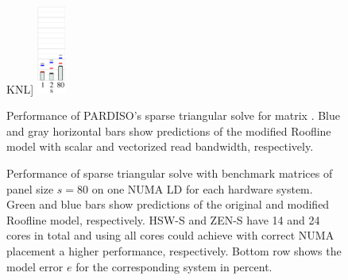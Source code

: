 \begin{figure}[t]
KNL]{%
\includegraphics[height=2.9cm,clip=true]{images/perf/ps-n-20000/p-single-core-knightmare1-n-20000}
\label{fig:p:single-core:knl}
} %
  \caption{Performance of PARDISO's sparse triangular solve
    for matrix . %
    Blue and gray horizontal bars show predictions of the modified Roofline model 
    with scalar and vectorized read bandwidth, respectively.
    }%
  \label{fig:p:single-core}%
\end{figure}

\begin{figure}%
  \centering%
  \caption{Performance of sparse triangular solve with benchmark matrices of
panel size $s=80$ on one NUMA LD for each hardware system.
  Green and blue bars show predictions of the original and modified Roofline
model, respectively.
  HSW-S and ZEN-S have 14 and 24 cores in total and using all cores could
achieve with correct NUMA placement a higher performance, respectively. 
  Bottom row shows the model error $e$ for the corresponding system in
percent.}%
  \label{fig:p:pardiso}
\end{figure}

